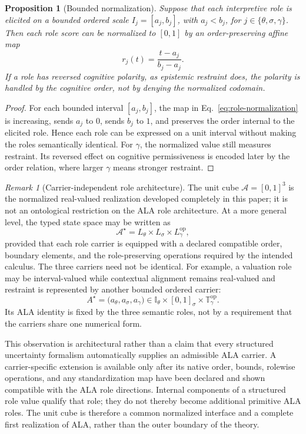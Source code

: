 \documentclass[reqno,final]{amsart}
\theoremstyle{definition}
\theoremstyle{plain}
\newtheorem{proposition}{Proposition}
\theoremstyle{remark}
\newtheorem{remark}{Remark}
\providecommand{\cA}{\mathcal{A}}
\begin{document}
\begin{proposition}[Bounded normalization]
Suppose that each interpretive role is elicited on a bounded ordered scale \(I_j=[a_j,b_j]\), with \(a_j<b_j\), for \(j\in\{\theta,\sigma,\gamma\}\). Then each role score can be normalized to \([0,1]\) by an order-preserving affine map
\begin{equation}
r_j(t)=\frac{t-a_j}{b_j-a_j}.
\label{eq:role-normalization}
\end{equation}
If a role has reversed cognitive polarity, as epistemic restraint does, the polarity is handled by the cognitive order, not by denying the normalized codomain.
\end{proposition}

\begin{proof}
For each bounded interval \([a_j,b_j]\), the map in Eq.~\eqref{eq:role-normalization} is increasing, sends \(a_j\) to \(0\), sends \(b_j\) to \(1\), and preserves the order internal to the elicited role. Hence each role can be expressed on a unit interval without making the roles semantically identical. For \(\gamma\), the normalized value still measures restraint. Its reversed effect on cognitive permissiveness is encoded later by the order relation, where larger \(\gamma\) means stronger restraint.
\end{proof}

\begin{remark}[Carrier-independent role architecture]
\label{rem:carrier-independent-architecture}
The unit cube \(\cA=[0,1]^3\) is the normalized real-valued realization developed completely in this paper; it is not an ontological restriction on the ALA role architecture. At a more general level, the typed state space may be written as
\begin{equation}
\mathcal A^{\star}
=
L_\theta\times L_\sigma\times L_\gamma^{\mathrm{op}},
\label{eq:general-ala-carrier}
\end{equation}
provided that each role carrier is equipped with a declared compatible order, boundary elements, and the role-preserving operations required by the intended calculus. The three carriers need not be identical. For example, a valuation role may be interval-valued while contextual alignment remains real-valued and restraint is represented by another bounded ordered carrier:
\[
A^{\star}
=
\bigl(a_\theta,a_\sigma,a_\gamma\bigr)
\in
\mathbb I_\theta\times[0,1]_\sigma\times\mathbb T_\gamma^{\mathrm{op}}.
\]
Its ALA identity is fixed by the three semantic roles, not by a requirement that the carriers share one numerical form.

This observation is architectural rather than a claim that every structured uncertainty formalism automatically supplies an admissible ALA carrier. A carrier-specific extension is available only after its native order, bounds, rolewise operations, and any standardization map have been declared and shown compatible with the ALA role directions. Internal components of a structured role value qualify that role; they do not thereby become additional primitive ALA roles. The unit cube is therefore a common normalized interface and a complete first realization of ALA, rather than the outer boundary of the theory.
\end{remark}
\end{document}
